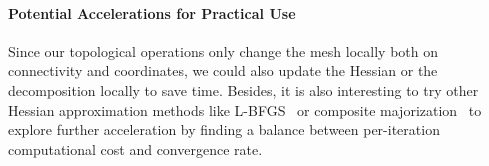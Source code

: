 \paragraph{Potential Accelerations for Practical Use}
Since our topological operations only change the mesh locally both on connectivity and coordinates, we could also update the Hessian or the decomposition locally to save time. Besides, it is also interesting to try other Hessian approximation methods like L-BFGS~\cite{Liu1989Limited} or composite majorization~\cite{Shtengel2017Geometric} to explore further acceleration by finding a balance between per-iteration computational cost and convergence rate.
